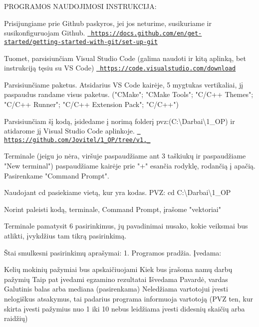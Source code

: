 PROGRAMOS NAUDOJIMOSI INSTRUKCIJA\+:
\begin{DoxyEnumerate}
\item Prisijungiame prie Github paskyros, jei jos neturime, susikuriame ir susikonfiguruojam Github. \href{https://docs.github.com/en/get-started/getting-started-with-git/set-up-git}{\texttt{ https\+://docs.\+github.\+com/en/get-\/started/getting-\/started-\/with-\/git/set-\/up-\/git}}
\item Tuomet, parsisiunčiam Visual Studio Code (galima naudoti ir kitą aplinką, bet instrukciją tęsiu su VS Code) \href{https://code.visualstudio.com/download}{\texttt{ https\+://code.\+visualstudio.\+com/download}}
\item Parsisiunčiame paketus. Atsidarius VS Code kairėje, 5 mygtukas vertikaliai, jį paspaudus randame visus paketus. ("{}\+CMake"{}; "{}\+CMake Tools"{}; "{}\+C/\+C++ Themes"{}; "{}\+C/\+C++ Runner"{}; "{}\+C/\+C++ Extension Pack"{}; "{}\+C/\+C++"{})
\item Parsisiunčiam šį kodą, įsidedame į norimą folderį pvz\+:(C\+:\textbackslash{}\+Darbai\textbackslash{}1\+\_\+\+OP) ir atidarome jį Visual Studio Code aplinkoje. \href{https://github.com/Jovitel/1_OP/tree/v1.0_1}{\texttt{ https\+://github.\+com/\+Jovitel/1\+\_\+\+OP/tree/v1.\+\_}}
\item Terminale (jeigu jo nėra, viršuje paspaudžiame ant 3 taškiukų ir paspaudžiame "{}\+New terminal"{}) paspaudžiame kairėje prie "{}+"{} esančia rodyklę, rodančią į apačią. Pasirenkame "{}\+Command Prompt"{}.
\item Naudojant cd pasiekiame vietą, kur yra kodas. PVZ\+: cd C\+:\textbackslash{}\+Darbai\textbackslash{}1\+\_\+\+OP
\item Norint paleisti kodą, terminale, Command Prompt, įrašome "{}vektoriai"{}
\item Terminale pamatysit 6 pasirinkimus, jų pavadinimai nusako, kokie veiksmai bus atlikti, įvykdžius tam tikrą pasirinkimą.
\end{DoxyEnumerate}

Štai smulkesni pasirinkimų aprašymai\+: 1. Programos pradžia. Įvedama\+:

Kelių mokinių pažymiai bus apskaičiuojami Kiek bus įrašoma namų darbų pažymių Taip pat įvedami egzamino rezultatai Išvedama Pavardė, vardas Galutinis balas arba mediana (pasirenkama) Neledžiama vartotojui įvesti nelogiškus atsakymus, tai padarius programa informuoja vartotoją (PVZ ten, kur skirta įvesti pažymius nuo 1 iki 10 nebus leidžiama įvesti didesnių skaičių arba raidžių)

